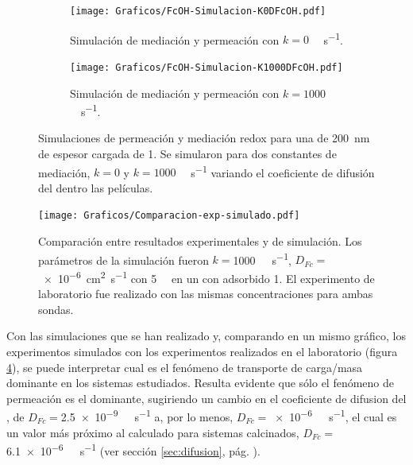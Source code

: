 			\begin{figure}[ht]
				\begin{subfigure}[t]{0.495\textwidth}
					\centering
			 	    \texttt{[image: Graficos/FcOH-Simulacion-K0DFcOH.pdf]}
			        \vspace*{-4mm}
			        \caption{Simulación de mediación y permeación con $k=0$ \si{\per\Molar\per\second}.}
			        \label{fig:sim_med_k0}
			      	\end{subfigure}
				\begin{subfigure}[t]{0.495\textwidth}
					\centering
			 	    \texttt{[image: Graficos/FcOH-Simulacion-K1000DFcOH.pdf]}
			        \vspace*{-4mm}
			        \caption{Simulación de mediación y permeación con $k=1000$ \si{\per\Molar\per\second}.}
			        \label{fig:sim_med_1000}
			      	\end{subfigure}
			      	\vspace*{-1mm}
			      	\caption[Simulación EQ de mediación/permeación]{Simulaciones de permeación y mediación redox para una \pdm\space de \SI{200}{nm} de espesor cargada de \ru\space \SI{1}{\Molar}. Se simularon para dos constantes de mediación, $k=0$ y $k=1000$ \si{\per\Molar\per\second} variando el coeficiente de difusión del \fc\space dentro las películas.}
			      	\label{fig:sim_med_perm}
			      	\end{figure}
			  	
		
				\begin{figure}[ht]
					\centering
			 	    \texttt{[image: Graficos/Comparacion-exp-simulado.pdf]}
			        \caption[Simulación EQ comparadas con datos experimentales]{Comparación entre resultados experimentales y de simulación. Los parámetros de la simulación fueron $k=$\SI{1000}{\per\Molar\per\second}, $D_{Fc}=$ \SI{e-6}{\square\cm\per\second} con \fc\space \SI{5}{\milli\Molar} en un \pdm\space con \ru\space adsorbido \SI{1}{\Molar}. El experimento de laboratorio fue realizado con las mismas concentraciones para ambas sondas.}
			        \label{fig:comp_sim_exp}
			      	\end{figure}
		

		Con las simulaciones que se han realizado y, comparando en un mismo gráfico, los experimentos simulados con los experimentos realizados en el laboratorio (figura \ref{fig:comp_sim_exp}), se puede interpretar cual es el fenómeno de transporte de carga/masa dominante en los sistemas estudiados. Resulta evidente que sólo el fenómeno de permeación es el dominante, sugiriendo un cambio en el coeficiente de difusion del \fc, de $D_{Fc}=$\SI{2.5e-9}{\per\Molar\per\second} a, por lo menos, $D_{Fc}\!=$\SI{e-6}{\per\Molar\per\second}, el cual es un valor más próximo al calculado para sistemas calcinados, $D_{Fc}=$\SI{6.1e-6}{\per\Molar\per\second} (ver sección \ref{sec:difusion}, pág. \pageref{sec:difusion}). 

